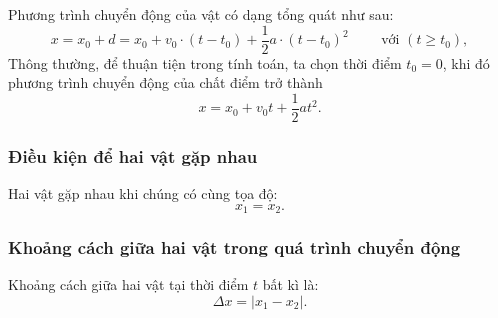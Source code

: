 \begin{tomtat}
\begin{itemize}
\begin{center}
	\end{center}
	Phương trình chuyển động của vật có dạng tổng quát như sau:
	\begin{equation*}
		x=x_0+d=x_0+v_0\cdot(t-t_0)+\dfrac{1}{2}a\cdot(t-t_0)^2\qquad\textrm{ với }(t\geq t_0),
	\end{equation*}
	Thông thường, để thuận tiện trong tính toán, ta chọn thời điểm $t_0=0$, khi đó phương trình chuyển động của chất điểm trở thành 
	\begin{equation*}
		x=x_0+v_0t+\dfrac{1}{2}at^{2}.
	\end{equation*}
\end{itemize}	
\subsubsection{Điều kiện để hai vật gặp nhau}
Hai vật gặp nhau khi chúng có cùng tọa độ:
\begin{equation*}
	x_1=x_2.
\end{equation*}
\subsubsection{Khoảng cách giữa hai vật trong quá trình chuyển động}
Khoảng cách giữa hai vật tại thời điểm $t$ bất kì là:
\begin{equation*}
	\Delta x=\left|x_1-x_2\right|.
\end{equation*}
\end{tomtat}
